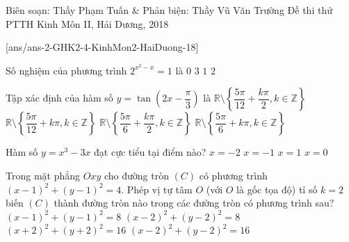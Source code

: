 
\begin{name}
{Biên soạn: Thầy Phạm Tuấn \& Phản biện: Thầy Vũ Văn Trường}
{Đề thi thử PTTH Kinh Môn II, Hải Dương, 2018}
\end{name}
\setcounter{ex}{0}
[ans/ans-2-GHK2-4-KinhMon2-HaiDuong-18]
\begin{ex}%
Số nghiệm của phương trình $2^{x^2-x}=1$ là
\choice
{$0$}
{$3$}
{$1$}
{\True $2$}
\end{ex}

\begin{ex}%
Tập xác định của hàm số $y=\tan \left ( 2x - \dfrac{\pi}{3}\right )$ là
\choice
{\True $\mathbb{R} \setminus \left \{ \dfrac{5\pi}{12} + \dfrac{k\pi}{2}, k \in \mathbb{Z}\right \}$}
{$\mathbb{R} \setminus \left \{ \dfrac{5\pi}{12} + k\pi,  k \in \mathbb{Z}\right \}$}
{$\mathbb{R} \setminus \left \{ \dfrac{5\pi}{6} + \dfrac{k\pi}{2}, k \in \mathbb{Z}\right \}$}
{$\mathbb{R} \setminus \left \{ \dfrac{5\pi}{6} + k\pi, k \in \mathbb{Z}\right \}$}
\end{ex}

\begin{ex}%
Hàm số $y=x^3-3x$ đạt cực tiểu tại điểm nào?
\choice
{$x=-2$}
{$x=-1$}
{\True $x=1$}
{$x=0$}
\end{ex}

\begin{ex}%
Trong mặt phẳng $Oxy$ cho đường tròn $(C)$ có phương trình $(x-1)^2+(y-1)^2=4$. Phép vị tự tâm $O$ (với $O$ là gốc tọa độ) tỉ số $k=2$ biến $(C)$ thành đường tròn nào trong các đường tròn có phương trình sau?
\choice
{$(x-1)^2+(y-1)^2=8$}
{$(x-2)^2+(y-2)^2=8$}
{$(x+2)^2+(y+2)^2=16$}
{\True $(x-2)^2+(y-2)^2=16$}
\end{ex}

